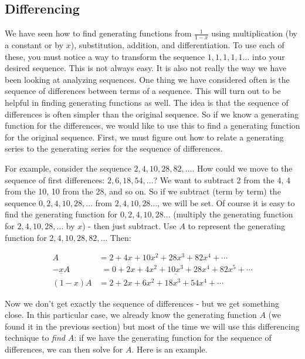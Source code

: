 \documentclass[12pt]{article}
\begin{document}
\subsection{Differencing}
We have seen how to find generating functions from $\frac{1}{1-x}$ using multiplication (by a constant or by $x$), substitution, addition, and differentiation.  To use each of these, you must notice a way to transform the sequence $1,1,1,1,1\ldots$ into your desired sequence.  This is not always easy.  It is also not really the way we have been looking at analyzing sequences.  One thing we have considered often is the sequence of differences between terms of a sequence.  This will turn out to be helpful in finding generating functions as well.  The idea is that the sequence of differences is often simpler than the original sequence.  So if we know a generating function for the differences, we would like to use this to find a generating function for the original sequence.  First, we must figure out how to relate a generating series to the generating series for the sequence of differences.
  
For example, consider the sequence $2, 4, 10, 28, 82, \ldots$.  How could we move to the sequence of first differences: $2, 6, 18, 54,\ldots$?  We want to subtract 2 from the 4, 4 from the 10, 10 from the 28, and so on.  So if we subtract (term by term) the sequence $0, 2, 4, 10, 28,\ldots$ from $2, 4, 10, 28\ldots$, we will be set.  Of course it is easy to find the generating function for $0,2,4,10,28\ldots$ (multiply the generating function for $2,4,10, 28, \ldots$ by $x$) - then just subtract.  Use $A$ to represent the generating function for $2, 4, 10, 28, 82, \ldots $  Then:

\begin{align*}
 A & = 2 + 4x + 10x^2 +28x^3 + 82x^4 + \cdots \\
 \underline{-xA} & \underline{\,\, = 0 + 2x + 4x^2 + 10x^3 + 28 x^4 + 82x^5 + \cdots} \\
 (1-x)A & = 2 + 2x + 6x^2 + 18x^3 + 54x^4 + \cdots
\end{align*}

Now we don't get exactly the sequence of differences - but we get something close.  In this particular case, we already know the generating function $A$ (we found it in the previous section) but most of the time we will use this differencing technique to {\em find} $A$: if we have the generating function for the sequence of differences, we can then solve for $A$.  Here is an example.
\end{document}
